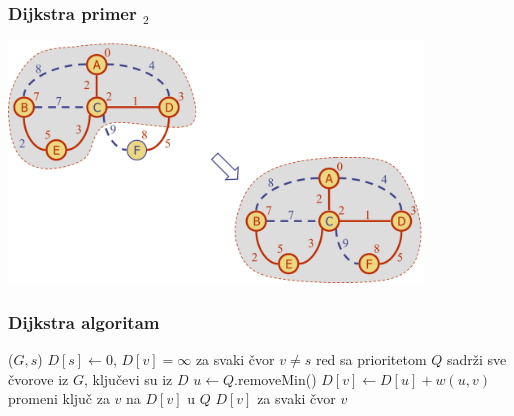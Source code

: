 \documentclass[compress,aspectratio=169]{beamer}
\begin{document}
\begin{frame}[fragile]
  \frametitle{Dijkstra primer $_2$}
  \begin{center}
    \includegraphics[width=11cm]{asp-14-pic63.png}
  \end{center}
\end{frame}

\begin{frame}[fragile]
  \frametitle{Dijkstra algoritam}
  \begin{algorithmic}
    \STATE {}($G,s$)
    \STATE $D[s] \leftarrow 0$, $D[v]=\infty$ za svaki čvor $v\neq s$
    \STATE red sa prioritetom $Q$ sadrži sve čvorove iz $G$, ključevi su iz $D$
      \STATE {}
      \STATE $u \leftarrow Q$.removeMin() 
        \STATE {}
          \STATE $D[v] \leftarrow D[u]+w(u,v)$
          \STATE promeni ključ za $v$ na $D[v]$ u $Q$
        \ENDIF
      \ENDFOR
    \ENDWHILE
    \RETURN $D[v]$ za svaki čvor $v$
  \end{algorithmic}
\end{frame}
\end{document}
